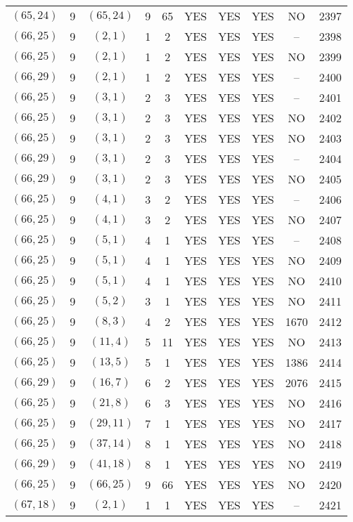 \begin{longtable}{|c|c|c|c|c|c|c|c|c|c|}
$(65, 24)$ & 9 & $(65, 24)$ & 9 & 65 & YES & YES & YES & NO & 2397\\
$(66, 25)$ & 9 & $(2, 1)$ & 1 & 2 & YES & YES & YES & -- & 2398\\
$(66, 25)$ & 9 & $(2, 1)$ & 1 & 2 & YES & YES & YES & NO & 2399\\
$(66, 29)$ & 9 & $(2, 1)$ & 1 & 2 & YES & YES & YES & -- & 2400\\
$(66, 25)$ & 9 & $(3, 1)$ & 2 & 3 & YES & YES & YES & -- & 2401\\
$(66, 25)$ & 9 & $(3, 1)$ & 2 & 3 & YES & YES & YES & NO & 2402\\
$(66, 25)$ & 9 & $(3, 1)$ & 2 & 3 & YES & YES & YES & NO & 2403\\
$(66, 29)$ & 9 & $(3, 1)$ & 2 & 3 & YES & YES & YES & -- & 2404\\
$(66, 29)$ & 9 & $(3, 1)$ & 2 & 3 & YES & YES & YES & NO & 2405\\
$(66, 25)$ & 9 & $(4, 1)$ & 3 & 2 & YES & YES & YES & -- & 2406\\
$(66, 25)$ & 9 & $(4, 1)$ & 3 & 2 & YES & YES & YES & NO & 2407\\
$(66, 25)$ & 9 & $(5, 1)$ & 4 & 1 & YES & YES & YES & -- & 2408\\
$(66, 25)$ & 9 & $(5, 1)$ & 4 & 1 & YES & YES & YES & NO & 2409\\
$(66, 25)$ & 9 & $(5, 1)$ & 4 & 1 & YES & YES & YES & NO & 2410\\
$(66, 25)$ & 9 & $(5, 2)$ & 3 & 1 & YES & YES & YES & NO & 2411\\
$(66, 25)$ & 9 & $(8, 3)$ & 4 & 2 & YES & YES & YES & 1670 & 2412\\
$(66, 25)$ & 9 & $(11, 4)$ & 5 & 11 & YES & YES & YES & NO & 2413\\
$(66, 25)$ & 9 & $(13, 5)$ & 5 & 1 & YES & YES & YES & 1386 & 2414\\
$(66, 29)$ & 9 & $(16, 7)$ & 6 & 2 & YES & YES & YES & 2076 & 2415\\
$(66, 25)$ & 9 & $(21, 8)$ & 6 & 3 & YES & YES & YES & NO & 2416\\
$(66, 25)$ & 9 & $(29, 11)$ & 7 & 1 & YES & YES & YES & NO & 2417\\
$(66, 25)$ & 9 & $(37, 14)$ & 8 & 1 & YES & YES & YES & NO & 2418\\
$(66, 29)$ & 9 & $(41, 18)$ & 8 & 1 & YES & YES & YES & NO & 2419\\
$(66, 25)$ & 9 & $(66, 25)$ & 9 & 66 & YES & YES & YES & NO & 2420\\
$(67, 18)$ & 9 & $(2, 1)$ & 1 & 1 & YES & YES & YES & -- & 2421\\

\end{longtable}
